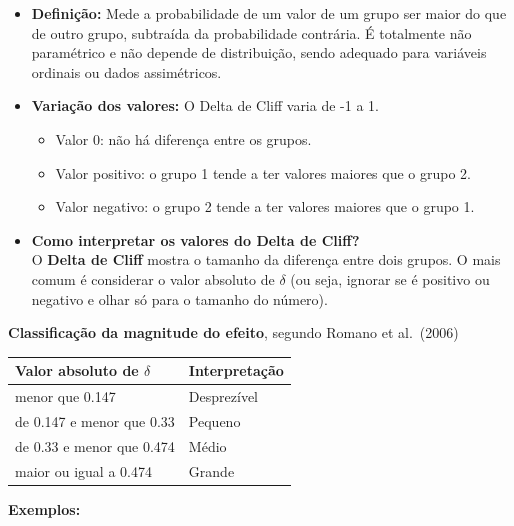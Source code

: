 \documentclass[
]{book}
\providecommand{\tightlist}{%
  \setlength{\itemsep}{0pt}\setlength{\parskip}{0pt}}
\begin{document}
\begin{itemize}
\tightlist
\item
  \textbf{Definição:} Mede a probabilidade de um valor de um grupo ser maior do que de outro grupo, subtraída da probabilidade contrária. É totalmente não paramétrico e não depende de distribuição, sendo adequado para variáveis ordinais ou dados assimétricos.
\item
  \textbf{Variação dos valores:} O Delta de Cliff varia de -1 a 1.

  \begin{itemize}
  \tightlist
  \item
    Valor 0: não há diferença entre os grupos.
  \item
    Valor positivo: o grupo 1 tende a ter valores maiores que o grupo 2.
  \item
    Valor negativo: o grupo 2 tende a ter valores maiores que o grupo 1.
  \end{itemize}
\item
  \textbf{Como interpretar os valores do Delta de Cliff?}\\
  O \textbf{Delta de Cliff} mostra o tamanho da diferença entre dois grupos. O mais comum é considerar o valor absoluto de \(\delta\) (ou seja, ignorar se é positivo ou negativo e olhar só para o tamanho do número).
\end{itemize}

\textbf{Classificação da magnitude do efeito}, segundo Romano et al.~(2006)

\begin{longtable}[]{@{}ll@{}}
\toprule\noalign{}
Valor absoluto de \(\delta\) & Interpretação \\
\midrule\noalign{}
\endhead
\bottomrule\noalign{}
\endlastfoot
menor que 0.147 & Desprezível \\
de 0.147 e menor que 0.33 & Pequeno \\
de 0.33 e menor que 0.474 & Médio \\
maior ou igual a 0.474 & Grande \\
\end{longtable}

\textbf{Exemplos:}
\end{document}
